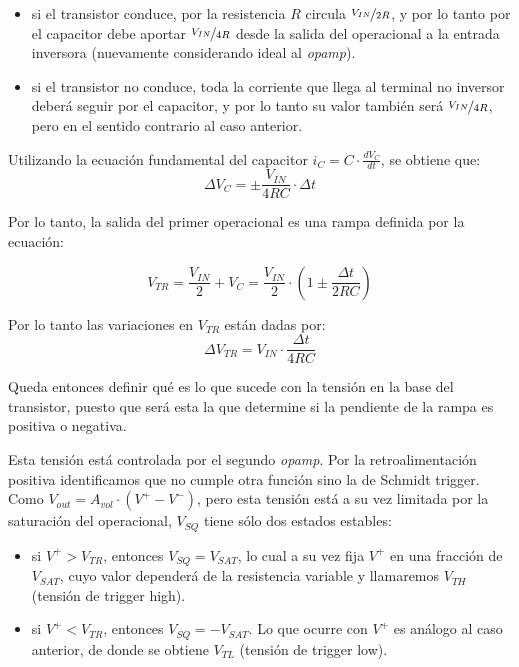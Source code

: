 \documentclass[../../tc_tp6_main.tex]{subfiles}
\begin{document}
\begin{itemize}
	\item si el transistor conduce, por la resistencia $R$ circula $\nicefrac{V_{IN}}{2R}$, y por lo tanto por el capacitor debe aportar $\nicefrac{V_{IN}}{4R}$ desde la salida del operacional a la entrada inversora (nuevamente considerando ideal al \textit{opamp}).
	\item si el transistor no conduce, toda la corriente que llega al terminal no inversor deber\'a seguir por el capacitor, y por lo tanto su valor tambi\'en ser\'a $\nicefrac{V_{IN}}{4R}$, pero en el sentido contrario al caso anterior.
\end{itemize}

Utilizando la ecuaci\'on fundamental del capacitor $i_C = C \cdot \frac{dV_C}{dt}$, se obtiene que:
\begin{equation}
	\Delta V_C = \pm \frac{V_{IN}}{4RC}\cdot\Delta t
	\label{eq:vc}
\end{equation}

Por lo tanto, la salida del primer operacional es una rampa definida por la ecuaci\'on:

\begin{equation}
	V_{TR} = \frac{V_{IN}}{2} + V_C = \frac{V_{IN}}{2} \cdot (1 \pm \frac{\Delta t}{2RC})
\end{equation}
 
Por lo tanto las variaciones en $V_{TR}$ est\'an dadas por:
\begin{equation}
	\Delta V_{TR} =  V_{IN} \cdot \frac{\Delta t}{4RC}
	\label{eq:vtr}	
\end{equation}

Queda entonces definir qu\'e es lo que sucede con la tensi\'on en la base del transistor, puesto que ser\'a esta la que determine si la pendiente de la rampa es positiva o negativa. \par

Esta tensi\'on est\'a controlada por el segundo \textit{opamp}. Por la retroalimentaci\'on positiva identificamos que no cumple otra funci\'on sino la de Schmidt trigger. Como $V_{out} = A_{vol} \cdot (V^+ - V^-)$, pero esta tensi\'on est\'a a su vez limitada por la saturaci\'on del operacional, $V_{SQ}$ tiene s\'olo dos estados estables:

\begin{itemize}
	\item si $V^+ > V_{TR}$, entonces $V_{SQ} = V_{SAT}$, lo cual a su vez fija $V^+$ en una fracci\'on de $V_{SAT}$, cuyo valor depender\'a de la resistencia variable y llamaremos $V_{TH}$ (tensi\'on de trigger high).
	\item si $V^+ < V_{TR}$, entonces $V_{SQ} = -V_{SAT}$. Lo que ocurre con $V^+$ es an\'alogo al caso anterior, de donde se obtiene $V_{TL}$ (tensi\'on de trigger low).
\end{itemize}
\end{document}
